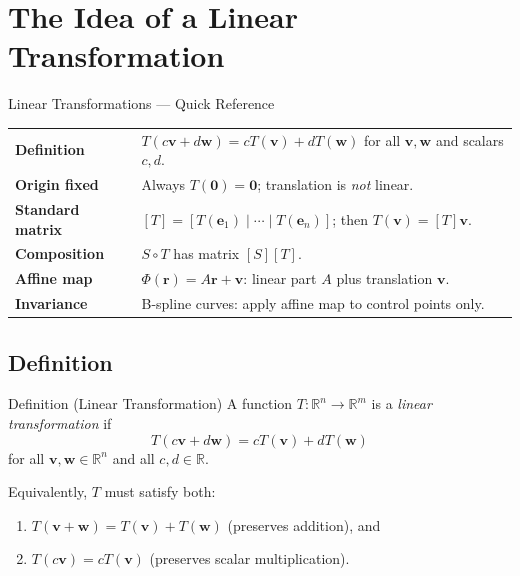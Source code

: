 
\section{The Idea of a Linear Transformation}

\begin{toolkitbox}{Linear Transformations --- Quick Reference}
\begin{tabular}{@{}p{}p{}@{}}
\textbf{Definition}        & $T(c\mathbf{v} + d\mathbf{w}) = cT(\mathbf{v}) + dT(\mathbf{w})$ for all $\mathbf{v},\mathbf{w}$ and scalars $c,d$. \\[4pt]
\textbf{Origin fixed}      & Always $T(\mathbf{0}) = \mathbf{0}$; translation is \emph{not} linear. \\[4pt]
\textbf{Standard matrix}   & $[T] = [T(\mathbf{e}_1)\mid\cdots\mid T(\mathbf{e}_n)]$; then $T(\mathbf{v}) = [T]\mathbf{v}$. \\[4pt]
\textbf{Composition}       & $S \circ T$ has matrix $[S][T]$. \\[4pt]
\textbf{Affine map}        & $\Phi(\mathbf{r}) = A\mathbf{r} + \mathbf{v}$: linear part $A$ plus translation $\mathbf{v}$. \\[4pt]
\textbf{Invariance}        & B-spline curves: apply affine map to control points only. \\
\end{tabular}
\end{toolkitbox}

\subsection*{Definition}

\begin{propositionbox}{Definition (Linear Transformation)}
A function $T : \mathbb{R}^n \to \mathbb{R}^m$ is a \emph{linear transformation} if
\[
  T(c\mathbf{v} + d\mathbf{w}) = cT(\mathbf{v}) + dT(\mathbf{w})
\]
for all $\mathbf{v}, \mathbf{w} \in \mathbb{R}^n$ and all $c, d \in \mathbb{R}$.

Equivalently, $T$ must satisfy both:
\begin{enumerate}
  \item $T(\mathbf{v} + \mathbf{w}) = T(\mathbf{v}) + T(\mathbf{w})$ \quad (preserves addition), and
  \item $T(c\mathbf{v}) = cT(\mathbf{v})$ \quad (preserves scalar multiplication).
\end{enumerate}
\end{propositionbox}


